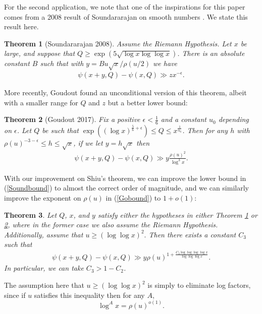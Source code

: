 \documentclass{amsart}
\newtheorem{theorem}{Theorem}[section]
\begin{document}
For the second application, we note that one of the inspirations for this paper comes from a 2008 result of Soundararajan on smooth numbers \cite{So}.  We state this result here.

\begin{theorem}[Soundararajan 2008]\label{SoundThm}
Assume the Riemann Hypothesis. Let $x$ be large, and suppose that $Q\geq \exp\left(5\sqrt{\log x\log\log x}\right)$.  There is an absolute constant $B$ such that with $y = Bu\sqrt x/\rho(u/2)$ we have
\begin{gather}\label{Soundbound}
\psi(x+y,Q)-\psi(x,Q)\gg zx^{-\epsilon}.
\end{gather}
\end{theorem}
More recently, Goudout \cite{Go} found an unconditional version of this theorem, albeit with a smaller range for $Q$ and $z$ but a better lower bound:
\begin{theorem}[Goudout 2017]\label{GoThm}
Fix a positive $\epsilon<\frac 16$ and a constant $u_0$ depending on $\epsilon$. Let $Q$ be such that $\exp\left((\log x)^{\frac 56+\epsilon}\right)\leq Q\leq x^{\frac 1{u_0}}$.  Then for any $h$ with $\rho(u)^{-3-\epsilon}\leq h\leq \sqrt x$, if we let $y=h\sqrt x$ then
\begin{gather}\label{Gobound}
\psi(x+y,Q)-\psi(x,Q)\gg y\frac{\rho(u)^2}{\log^3 x}.
\end{gather}
\end{theorem}
With our improvement on Shiu's theorem, we can improve the lower bound in (\ref{Soundbound}) to almost the correct order of magnitude, and we can similarly improve the exponent on $\rho(u)$ in (\ref{Gobound}) to $1+o(1)$:
\begin{theorem}\label{smooththm}
Let $Q$, $x$, and $y$ satisfy either the hypotheses in either Theorem \ref{SoundThm} or \ref{GoThm}, where in the former case we also assume the Riemann Hypothesis.  Additionally, assume that $u\geq (\log\log x)^2.$  Then there exists a constant $C_3$ such that 
\begin{gather}
\psi(x+y,Q)-\psi(x,Q)\gg y\rho(u)^{1+\frac{C_3\log\log \log\log x}{\log\log \log x}}.
\end{gather}
In particular, we can take $C_3>1-C_2$.
\end{theorem}
The assumption here that $u\geq (\log\log x)^2$ is simply to eliminate log factors, since if $u$ satisfies this inequality then for any $A$, $$\log^A x=\rho(u)^{o(1)}.$$
\end{document}
